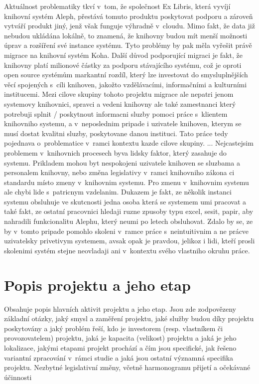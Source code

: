 \documentclass[
	12pt, oneside, printed, final, 
	table,   %
	lof,     %
	lot     %
]{fithesis3}
\begin{document}
{Aktuálnost problematiky tkví v~tom, že společnost Ex Libris, která vyvíjí knihovní 
systém Aleph, přestává tomuto produktu poskytovat podporu a zároveň vytváří produkt jiný, 
jenž však funguje výhradně v~cloudu. 
Mimo fakt, že data již nebudou ukládána lokálně, to znamená, že knihovny budou mít 
menší možnosti úprav a rozšíření své instance systému. Tyto problémy by pak měla 
vyřešit právě migrace na knihovní systém Koha. 
Další důvod podporující migraci je fakt, že knihovny platí milionové částky za 
podporu stávajícího systému, což je oproti open source systémům markantní rozdíl, 
který lze investovat do smysluplnějších  věcí spojených s~cíli knihoven, 
jakožto vzdělávacími, informačními a kulturními institucemi. 
Mezi cilove skupiny tohoto projektu migrace ale nepatri jenom systemovy knihovnici, spravci a vedeni knihovny ale také zamestnanci který potrebuji splnit / poskytnout informacni sluzby pomoci práce s~klientem knihovniho systemu, a v~neposlednim pripade i uzivatele knihoven, kterym se musí dostat kvalitni sluzby, poskytovane danou instituci. 
Tato práce tedy pojednava o~problematice v~ramci kontextu kazde cilove skupiny. 
...
Nejcastejsim problemem v~knihovnich procesech byva lidsky faktor, který zasahuje do systemu. Prikladem mohou byt nespokojeni uzivatele knihoven se sluzbama a personalem knihovny, nebo změna legislativy v~ramci knihovniho zákona ci standardu místo zmeny v~knihovnim systemu. Pro zmenu v~knihovnim systemu ale chybi lide s~patricnym vzdelanim. Dukazem je fakt, ze několik instanci systemu obsluhuje ve skutcnosti jedna osoba která se systemem umi pracovat a také fakt, ze ostatní pracovnici hledaji ruzne zpusoby typu excel, sesit, papir, aby nahradili funkcionalitu Alephu, který neumi po letech obsluhovat. 
Zdalo by se, ze by v~tomto pripade pomohlo skoleni v~ramce práce s~neintuitivnim a ne prácve uzivatelsky privetivym systemem, avsak opak je pravdou, jelikoz i lidi, kteří prosli skolenimi systém stejne neovladaji ani v~kontextu svého vlastniho okruhu práce. 

\section{Popis projektu a jeho etap}

Obsahuje popis hlavních aktivit projektu a jeho etap. Jsou zde zodpovězeny základní
otázky, jaký smysl a zaměření projektu, jaké služby budou díky projektu poskytovány
a jaký problém řeší, kdo je investorem (resp. vlastníkem či provozovatelem) projektu,
jaká je kapacita (velikost) projektu a jaká je jeho lokalizace, jakými etapami projekt
prochází a čím jsou specifické, jak řešeno variantní zpracování v~rámci studie a jaká
jsou ostatní významná specifika projektu. Nezbytné legislativní změny, včetně
harmonogramu přijetí a očekávané účinnosti

}
\end{document}
